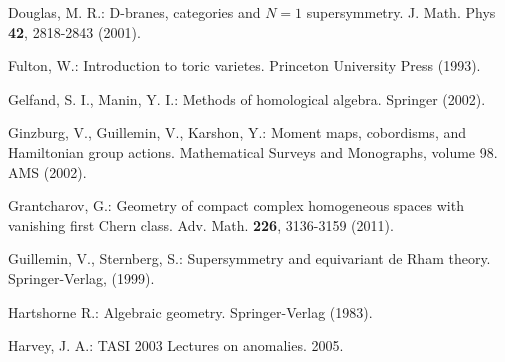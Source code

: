 \documentclass[xypic,amscd,syntonly,amssymb,verbatim,12pt]{amsart}
\theoremstyle{plain}
\theoremstyle{definition}
\theoremstyle{remark}
\numberwithin{equation}{section}
\begin{document}
\begin{thebibliography}{99}
 


 


 Douglas, M. R.: D-branes, categories and $N=1$ supersymmetry. J. Math. Phys {\bf 42}, 2818-2843 (2001).

 Fulton, W.: Introduction to toric varietes. Princeton University
 Press (1993).



Gelfand, S. I., Manin, Y. I.: Methods of homological algebra. Springer (2002).



 Ginzburg, V., Guillemin, V.,  Karshon, Y.: Moment maps, cobordisms, and Hamiltonian group actions.
  Mathematical Surveys and Monographs,
 volume 98. AMS (2002).


 




 


 
 
 
 


 






 
 


 Grantcharov, G.: Geometry of compact complex homogeneous spaces
 with vanishing first Chern class. Adv. Math. {\bf 226}, 3136-3159 (2011).


 
 




 
  
   



   
 
 
 
 

 

 
 
  
  


   Guillemin,  V.,    Sternberg, S.:
    Supersymmetry and equivariant de Rham theory.
   Springer-Verlag,  (1999).

 
 
 



  Hartshorne  R.:
   Algebraic  geometry. Springer-Verlag (1983).

 Harvey, J. A.: TASI 2003 Lectures on anomalies. 2005.







\end{thebibliography}
\end{document}
